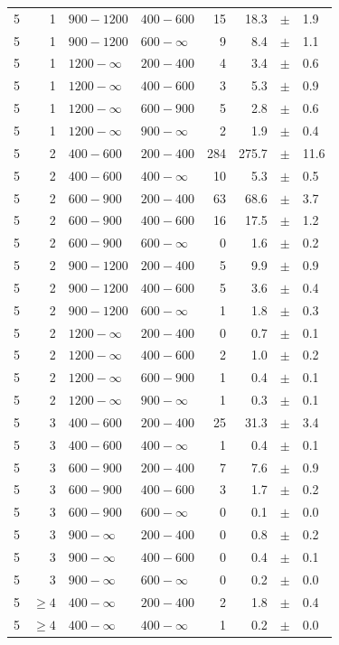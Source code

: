\begin{table}[!h]
\begin{tabular}{rrllrrcl}
5 & 1 & $ 900-1200$ & $400-600$ &     15 &     18.3 &$\pm$&    1.9 \\
5 & 1 & $ 900-1200$ & $600-\infty$ &      9 &      8.4 &$\pm$&    1.1 \\
5\T & 1 & $1200- \infty$ & $200-400$ &      4 &      3.4 &$\pm$&    0.6 \\
5 & 1 & $1200- \infty$ & $400-600$ &      3 &      5.3 &$\pm$&    0.9 \\
5 & 1 & $1200- \infty$ & $600-900$ &      5 &      2.8 &$\pm$&    0.6 \\
5 & 1 & $1200- \infty$ & $900-\infty$ &      2 &      1.9 &$\pm$&    0.4 \\
5\T & 2 & $ 400- 600$ & $200-400$ &    284 &    275.7 &$\pm$&   11.6 \\
5 & 2 & $ 400- 600$ & $400-\infty$ &     10 &      5.3 &$\pm$&    0.5 \\
5\T & 2 & $ 600- 900$ & $200-400$ &     63 &     68.6 &$\pm$&    3.7 \\
5 & 2 & $ 600- 900$ & $400-600$ &     16 &     17.5 &$\pm$&    1.2 \\
5 & 2 & $ 600- 900$ & $600-\infty$ &      0 &      1.6 &$\pm$&    0.2 \\
5\T & 2 & $ 900-1200$ & $200-400$ &      5 &      9.9 &$\pm$&    0.9 \\
5 & 2 & $ 900-1200$ & $400-600$ &      5 &      3.6 &$\pm$&    0.4 \\
5 & 2 & $ 900-1200$ & $600-\infty$ &      1 &      1.8 &$\pm$&    0.3 \\
5\T & 2 & $1200- \infty$ & $200-400$ &      0 &      0.7 &$\pm$&    0.1 \\
5 & 2 & $1200- \infty$ & $400-600$ &      2 &      1.0 &$\pm$&    0.2 \\
5 & 2 & $1200- \infty$ & $600-900$ &      1 &      0.4 &$\pm$&    0.1 \\
5 & 2 & $1200- \infty$ & $900-\infty$ &      1 &      0.3 &$\pm$&    0.1 \\
5\T & 3 & $ 400- 600$ & $200-400$ &     25 &     31.3 &$\pm$&    3.4 \\
5 & 3 & $ 400- 600$ & $400-\infty$ &      1 &      0.4 &$\pm$&    0.1 \\
5\T & 3 & $ 600- 900$ & $200-400$ &      7 &      7.6 &$\pm$&    0.9 \\
5 & 3 & $ 600- 900$ & $400-600$ &      3 &      1.7 &$\pm$&    0.2 \\
5 & 3 & $ 600- 900$ & $600-\infty$ &      0 &      0.1 &$\pm$&    0.0 \\
5\T & 3 & $ 900- \infty$ & $200-400$ &      0 &      0.8 &$\pm$&    0.2 \\
5 & 3 & $ 900- \infty$ & $400-600$ &      0 &      0.4 &$\pm$&    0.1 \\
5 & 3 & $ 900- \infty$ & $600-\infty$ &      0 &      0.2 &$\pm$&    0.0 \\
5\T & $\geq 4$ & $ 400- \infty$ & $200-400$ &      2 &      1.8 &$\pm$&    0.4 \\
5 & $\geq 4$ & $ 400- \infty$ & $400-\infty$ &      1 &      0.2 &$\pm$&    0.0 \\
    \hline
  \end{tabular}
\end{table}

